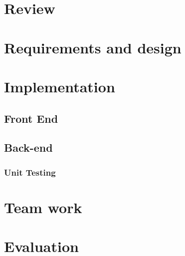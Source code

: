 \documentclass{article}
\begin{document}
	\section{Review}
	\section{Requirements and design}
	\section{Implementation}
	\subsection{Front End}
	\subsection{Back-end}
	\subsubsection{Unit Testing}
	\section{Team work}
	\section{Evaluation}
	
	\clearpage
	
	
\end{document}
